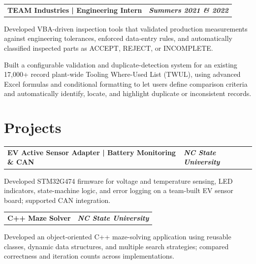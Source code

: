 \documentclass[10pt,letterpaper]{article}
\makeatletter
\newcommand{\resumeentry}[2]{%
  \begin{tabularx}{\textwidth}{@{}X>{\raggedleft\arraybackslash}p{2.40in}@{}}
    \textbf{#1} & \textbf{\textit{#2}}
  \end{tabularx}\vspace{-0.075cm}
}
\makeatother
\begin{document}
\resumeentry{TEAM Industries | Engineering Intern}{Summers 2021 \& 2022}
\begin{resumebullets}
  \item Developed VBA-driven inspection tools that validated production measurements against engineering tolerances, enforced data-entry rules, and automatically classified inspected parts as ACCEPT, REJECT, or INCOMPLETE.  
  \item Built a configurable validation and duplicate-detection system for an existing 17,000+ record plant-wide Tooling Where-Used List (TWUL), using advanced Excel formulas and conditional formatting to let users define comparison criteria and automatically identify, locate, and highlight duplicate or inconsistent records.
\end{resumebullets}

\section{Projects}

\resumeentry{EV Active Sensor Adapter | Battery Monitoring \& CAN}{NC State University}
\begin{resumebullets}
  \item Developed STM32G474 firmware for voltage and temperature sensing, LED indicators, state-machine logic, and error logging on a team-built EV sensor board; supported CAN integration.
\end{resumebullets}

\resumeentry{C++ Maze Solver}{NC State University}
\begin{resumebullets}
  \item Developed an object-oriented C++ maze-solving application using reusable classes, dynamic data structures, and multiple search strategies; compared correctness and iteration counts across implementations.
\end{resumebullets}
\end{document}
